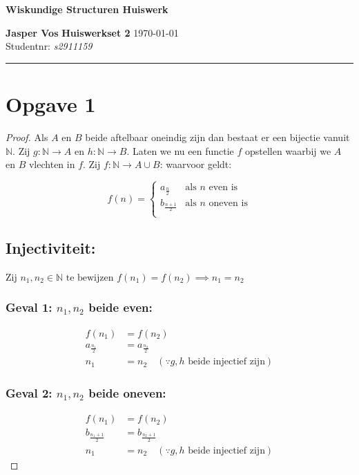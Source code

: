 \documentclass{article}
\begin{document}
{\Large \textbf{Wiskundige Structuren Huiswerk}}

\bigskip

\textbf{Jasper Vos} \hfill \textbf{Huiswerkset 2} \hfill \today \\
Studentnr: \emph{s2911159}

\rule{\textwidth}{2pt}

\bigskip

\newcommand{\N}{\mathbb{N}}
\newcommand{\f}[2]{\frac{#1}{#2}}
\newcommand{\tx}[1]{\text{#1}}
\newcommand{\cn}[1]{\cancel{#1}}
\newcommand{\R}{\mathbb{R}}

\section*{Opgave 1}
\begin{proof}

    Als $A$ en $B$ beide aftelbaar oneindig zijn dan
    bestaat er een bijectie vanuit $\N$.
    Zij $g: \N \rightarrow A$ en $h: \N \rightarrow B$.
    Laten we nu een functie $f$ opstellen
    waarbij we $A$ en $B$ vlechten in $f$.
    Zij $f:\N \rightarrow A \cup B$: waarvoor geldt:

    \[
        f(n) = \begin{cases}
            a_{\f{n}{2}}   & \tx{als $n$ even is}   \\
            b_{\f{n+1}{2}} & \tx{als $n$ oneven is} \\
        \end{cases}
    \]

    \subsection*{Injectiviteit:}
    Zij $n_1, n_2 \in \N \tx{ te bewijzen } f(n_1) = f(n_2) \implies n_1 = n_2$
    \subsubsection*{Geval 1: $n_1, n_2$ beide even:}
    \begin{align*}
        f(n_1)         & = f(n_2)                                               \\
        a_{\f{n_1}{2}} & = a_{\f{n_2}{2}}                                       \\
        n_1            & = n_2 \quad (\because g, h \tx{ beide injectief zijn})
    \end{align*}
    \subsubsection*{Geval 2: $n_1, n_2$ beide oneven:}
    \begin{align*}
        f(n_1)           & = f(n_2)                                               \\
        b_{\f{n_1+1}{2}} & = b_{\f{n_2+1}{2}}                                     \\
        n_1              & = n_2 \quad (\because g, h \tx{ beide injectief zijn})
    \end{align*}

\end{proof}
\end{document}
